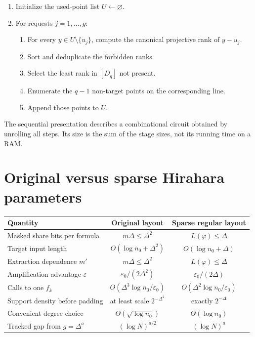 \documentclass[11pt]{article}
\theoremstyle{definition}
\newcommand{\eps}{\varepsilon}
\begin{document}
\begin{enumerate}
\item Initialize the used-point list $U\leftarrow\varnothing$.
\item For requests $j=1,\ldots,g$:
  \begin{enumerate}
  \item For every $y\in U\setminus\{u_j\}$, compute the canonical projective rank of $y-u_j$.
  \item Sort and deduplicate the forbidden ranks.
  \item Select the least rank in $[D_q]$ not present.
  \item Enumerate the $q-1$ non-target points on the corresponding line.
  \item Append those points to $U$.
  \end{enumerate}
\end{enumerate}

The sequential presentation describes a combinational circuit obtained by unrolling all steps.  Its size is the sum of the stage sizes, not its running time on a RAM.

\section{Original versus sparse Hirahara parameters}

\begin{center}
\renewcommand{\arraystretch}{1.25}
\begin{tabular}{>{\raggedright\arraybackslash}p{}cc}
\toprule
Quantity & Original layout & Sparse regular layout\\
\midrule
Masked share bits per formula & $m\Delta\le\Delta^2$ & $L(\varphi)\le\Delta$\\
Target input length & $O(\log n_0+\Delta^2)$ & $O(\log n_0+\Delta)$\\
Extraction dependence $m'$ & $m\Delta\le\Delta^2$ & $L(\varphi)\le\Delta$\\
Amplification advantage $\eps$ & $\eps_0/(2\Delta^2)$ & $\eps_0/(2\Delta)$\\
Calls to one $f_k$ & $O(\Delta^3\log n_0/\eps_0)$ & $O(\Delta^2\log n_0/\eps_0)$\\
Support density before padding & at least scale $2^{-\Delta^2}$ & exactly $2^{-\Delta}$\\
Convenient degree choice & $\Theta(\sqrt{\log n_0})$ & $\Theta(\log n_0)$\\
Tracked gap from $g=\Delta^a$ & $(\log N)^{a/2}$ & $(\log N)^a$\\
\bottomrule
\end{tabular}
\end{center}
\end{document}
